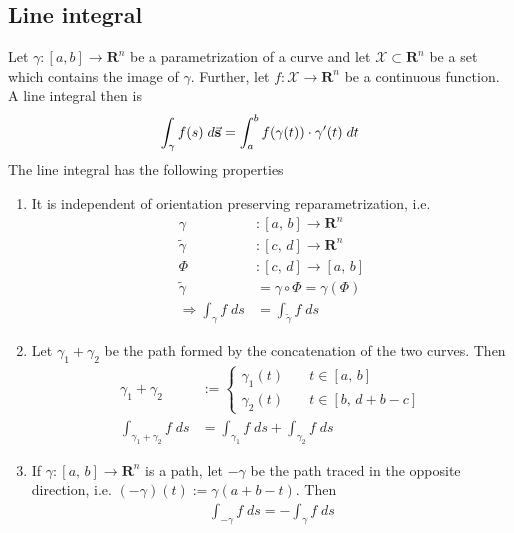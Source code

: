 \documentclass[8pt]{extarticle}
\newcommand{\R}{{\mathbb R}}
\newcommand{\X}{{\mathcal X}}
\newcommand{\ra}{{\rightarrow}}
\newcommand{\Ra}{{\Rightarrow}}
\def\R{\mathbf{R}}
\begin{document}
\begin{multicols*}{3}
  \subsection{Line integral}
  Let $\gamma: [a, b] \ra \R^n$ be a parametrization
  of a curve and let $\X \subset \R^n$ be a set which contains
  the image of $\gamma$. Further, let $f: \X \ra \R^n$ be a continuous
  function. A line integral then is
  \begin{align*}
    \int_\gamma f(s) \; d \vectorarrow{s} = \int_a^b f(\gamma(t)) \cdot \gamma'(t) \; dt
  \end{align*}
  The line integral has the following properties
  \begin{enumerate}[label=(\arabic*)]
    \item It is independent of orientation preserving reparametrization, i.e.
          \begin{align*}
            \gamma                  & : [a,\, b] \ra \R^n                      \\
            \tilde{\gamma}          & : [c,\, d] \ra \R^n                      \\
            \varPhi                 & : [c, \, d] \ra [a, \, b]                \\
            \tilde{\gamma}          & = \gamma \circ \varPhi = \gamma(\varPhi) \\
            \Ra \int_\gamma f \; ds & = \int_{\tilde{\gamma}} f \; ds
          \end{align*}
    \item Let $\gamma_1 + \gamma_2$ be the path formed
          by the concatenation of the two curves. Then
          \begin{align*}
            \gamma_1 + \gamma_2                & :=
            \begin{cases}
              \gamma_1(t) \quad & t \in [a, \, b]         \\
              \gamma_2(t) \quad & t \in [b, \, d + b - c]
            \end{cases}                                                              \\
            \int_{\gamma_1 + \gamma_2} f \; ds & = \int_{\gamma_1} f \; ds + \int_{\gamma_2} f\; ds
          \end{align*}
    \item If $\gamma: [a, \, b] \ra \R^n$ is a path, let $-\gamma$
          be the path traced in the opposite direction, i.e.
          $(-\gamma)(t) := \gamma(a + b - t)$. Then
          \begin{align*}
            \int_{-\gamma} f \; ds = - \int_\gamma f \; ds
          \end{align*}
  \end{enumerate}
\begin{tcolorbox}[colback=blue!5!white,colframe=blue!75!black]

\end{tcolorbox}
\end{multicols*}
\end{document}
